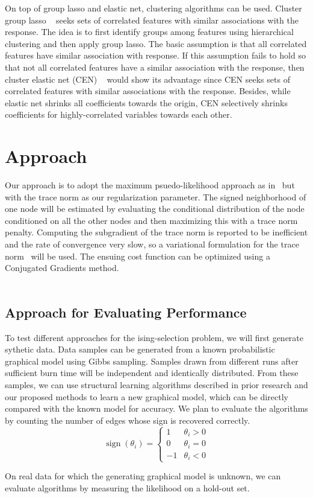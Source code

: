 \documentclass[11pt]{article}
\begin{document}
On top of group lasso and elastic net, clustering algorithms can be used. Cluster group lasso ~\cite{Peter2013Cor} seeks sets of correlated features with similar associations with the response. The idea is to first identify groups among features using hierarchical clustering and then apply group lasso. The basic assumption is that all correlated features have similar association with response. If this assumption fails to hold so that not all correlated features have a similar association with the response, then cluster elastic net (CEN) ~\cite{Dan2014The} would show its advantage since CEN seeks sets of correlated features with similar associations with the response. Besides, while elastic net shrinks all coefficients towards the origin, CEN selectively shrinks coefficients for highly-correlated variables towards each other.

\section{Approach}
Our approach is to adopt the maximum psuedo-likelihood approach as in~\cite{ravikumar2010high} but with the trace norm as our regularization parameter. The signed neighborhood of one node will be estimated by evaluating the conditional distribution of the node conditioned on all the other nodes and then maximizing this with a trace norm penalty. Computing the subgradient of the trace norm is reported to be inefficient and the rate of convergence very slow, so a variational formulation for the trace norm~\cite{grave2011trace} will be used. The ensuing cost function can be optimized using a Conjugated Gradients method. \\ \\ 
 
\subsection{Approach for Evaluating Performance}
To test different approaches for the ising-selection problem, we will first generate sythetic data. Data samples can be generated from a known probabilistic graphical model using Gibbs sampling. Samples drawn from different runs after sufficient burn time will be independent and identically distributed.  From these samples, we can use structural learning algorithms described in prior research and our proposed methods to learn a new graphical model, which can be directly compared with the known model for accuracy. We plan to evaluate the algorithms by counting the number of edges whose sign is recovered correctly.
$$\operatorname{sign}(\theta_i) = \begin{cases} 1 & \theta_i > 0\\ 0 & \theta_i = 0 \\ -1 & \theta_i < 0 \end{cases}$$

On real data for which the generating graphical model is unknown, we can evaluate algorithms by measuring the likelihood on a hold-out set.


{}

\end{document}
